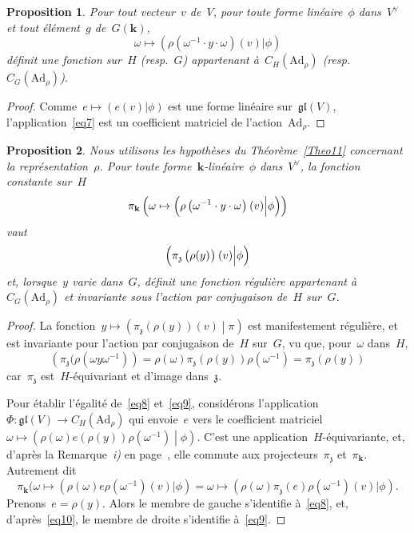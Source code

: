 \documentclass[french]{amsart}
\newcommand{\kk}{\mathbf{k}}
\newcommand{\Ad}{\mathrm{Ad}}
\newcommand{\lie}[1]{{\mathfrak{#1}}}
\newcommand{\gl}{\lie{gl}}
\newcommand{\z}{\lie{z}}
\newtheorem{proposition}{Proposition}[section]
\begin{document}
\begin{proposition}\label{prop33}\label{Prop33} Pour tout vecteur~$v$ de~$V$, pour toute forme linéaire~$\phi$ dans~$V^\vee$ et tout élément~$g$ de~$G(\kk)$,
\begin{equation}\label{eq7}
\omega\mapsto(\rho(\omega^{-1}\cdot y\cdot \omega)(v)|\phi)
\end{equation}
définit une fonction sur~$H$ (resp.~$G$) appartenant à~$C_H (\Ad_\rho )$ (resp.~$C_G (\Ad_\rho )$).
\end{proposition}
\begin{proof} Comme~$e\mapsto(e(v)|\phi)$ est une forme linéaire sur~$\gl(V)$, l'application~\eqref{eq7} est un coefficient matriciel de l’action~$\Ad_\rho$.
\end{proof}
\begin{proposition}\label{propr34}\label{Prop34}
Nous utilisons les hypothèses du Théorème~\ref{Theo11} concernant la représentation~$\rho$. Pour toute forme~$\kk$-linéaire~$\phi$ dans~$V^\vee$, la fonction constante sur~$H$
\begin{equation}\label{eq8}
\pi_\kk\left(\omega\mapsto\left(\rho\left(\omega^{-1}\cdot y\cdot\omega^{\vphantom{l}}\right)^{\vphantom{l}}(v)\middle|\phi\right)\right)
\end{equation}
vaut
\begin{equation}\label{eq9}
\left(\pi_{\z}\left(\rho(y)^{\vphantom{l}}\right)^{\vphantom{i}}(v)\middle| \phi \right)
\end{equation}
et, lorsque~$y$ varie dans~$G$, définit une fonction régulière appartenant à~$C_G(\Ad_\rho)$ et invariante sous l'action par conjugaison de~$H$ sur~$G$.
\end{proposition}
\begin{proof}
La fonction~$y\mapsto\left(\pi_{\z}(\rho(y))(v)\middle|\pi\right)$ est manifestement régulière, et est invariante pour l'action par conjugaison de~$H$ sur~$G$, vu que, pour~$\omega$ dans~$H$,
\begin{equation}\label{eq10}
	\left(\pi_{\z}(\rho(\omega y \omega^{-1})\right)
		=
	\rho(\omega)\pi_{\z}(\rho(y))\rho(\omega^{-1})
		=
	\pi_{\z}(\rho(y))
\end{equation}
car~$\pi_\z$ est~$H$-équivariant et d'image dans~$\z$.

Pour établir l'égalité de~\eqref{eq8} et~\eqref{eq9}, considérons l'application~$\Phi:\gl(V)\to C_H(\Ad_\rho)$  qui envoie~$e$ vers le coefficient matriciel~$\omega\mapsto\left(\rho(\omega)e(\rho(y))\rho(\omega^{-1})\middle|\phi\right)$.
C'est une application~$H$-équivariante, et, d'après la Remarque~\emph{i)} en page~\pageref{Remarquei}, elle commute aux projecteurs~$\pi_\z$ et~$\pi_\kk$. Autrement dit
\[
\pi_\kk(\omega\mapsto(\rho(\omega)e\rho(\omega^{-1})(v)|\phi)=\omega\mapsto(\rho(\omega)\pi_\z(e)\rho(\omega^{-1})(v)|\phi).
\]
Prenons~$e=\rho(y)$. Alors le membre de gauche s'identifie à~\eqref{eq8}, et, d'après~\eqref{eq10}, le membre de droite s'identifie à~\eqref{eq9}.
\end{proof}
\end{document}
